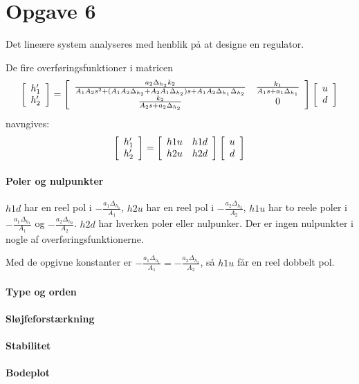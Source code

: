 \section{Opgave 6}
Det lineære system analyseres med henblik på at designe en regulator.

De fire overføringsfunktioner i matricen
\begin{equation*}
\matrix{c}{}{}{ h'_1 \\ h'_2 } =
\matrix{c c}{}{}{
\frac{ a_2 \Delta_{h_2} k_2 }
	{ A_1A_2s^2
	+ ( A_1 A_2 \Delta_{h_2} + A_2 A_1 \Delta_{h_2} ) s
	+ A_1 A_2 \Delta_{h_1} \Delta_{h_2} } &
\frac{k_1}{ A_1 s + a_1 \Delta_{h_1} } \\
\frac{k_2}{ A_2 s + a_2 \Delta_{h_2} } &
0
}
\matrix{c}{}{}{ u \\ d }
\end{equation*}
navngives:
\begin{equation*}
\matrix{c}{}{}{ h'_1 \\ h'_2 } =
\matrix{c c}{}{}{
h1u & h1d \\ h2u & h2d
}
\matrix{c}{}{}{ u \\ d }
\end{equation*}

\paragraph{Poler og nulpunkter}
	$h1d$ har en reel pol i $-\frac{a_1\Delta_{h_1}}{A_1}$, $h2u$ har en reel pol i
	$-\frac{a_2\Delta_{h_2}}{A_2}$, $h1u$ har to reele poler i
	$-\frac{a_1\Delta_{h_1}}{A_1}$ og $-\frac{a_2\Delta_{h_2}}{A_2}$. $h2d$ har
	hverken poler eller nulpunker. Der er ingen nulpunkter i nogle af
	overføringsfunktionerne.
	
	Med de opgivne konstanter er $-\frac{a_1\Delta_{h_1}}{A_1} =
	-\frac{a_2\Delta_{h_2}}{A_2}$, så $h1u$ får en reel dobbelt pol.
\paragraph{Type og orden}
\paragraph{Sløjfeforstærkning}
\paragraph{Stabilitet}
\paragraph{Bodeplot}